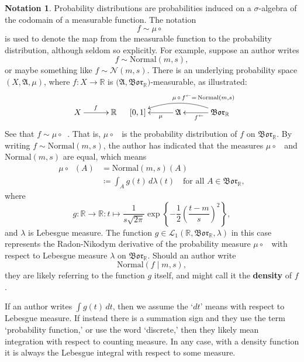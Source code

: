 \documentclass[
twoside=true,
paper=letter,
fontsize=9pt,
pagesize=auto,
leqno,
openany,
headsepline,
overfullrule,
]{scrbook}
\theoremstyle{plain}
\theoremstyle{plain}
\theoremstyle{definition}
\newtheorem{notn}[thm]{Notation}
\theoremstyle{bfnoteitalic}
\theoremstyle{bfnoteroman}
\newcommand{\term}[1]{\textbf{#1}\index{#1}}
\newcommand{\sigalg}[1]{\mathfrak{#1}}
\newcommand{\cali}[1]{\mathscr{#1}}
\newcommand{\definedby}{\coloneqq}
\newcommand{\borel}{\mathfrak{Bor}}
\newcommand{\textsigma}{\hbox{\large{$\sigma$}}\kern-1pt}
\newcommand{\preimage}[1]{\mathop{#1^{\leftarrow}}}
\newcommand{\R}{\mathbb{R}}
\newcommand{\sigmaalgebra}{\sigalg{A}}
\newcommand{\funcf}{f}
\newcommand{\funcg}{g}
\newcommand{\function}{f}
\newcommand{\functionii}{g}
\newcommand{\measurespace}{X}
\newcommand{\measure}{\mu}
\newcommand{\measmu}{\mu}
\newcommand{\measlambda}{\lambda}
\newcommand{\seti}{A}
\begin{document}
\begin{notn}\label{density_functions}
Probability distributions are probabilities induced on a \textsigma-algebra of the codomain of a measurable function. The notation
\[
\function \sim \measure\circ\preimage{\function}
\]
is used to denote the map from the measurable function to the probability distribution, although seldom so explicitly.
For example, suppose an author writes 
\[
\function\sim \text{Normal}(m,s),
\]
or maybe something like $\function\sim \cali{N}(m,s)$.
There is an underlying probability space
$(\measurespace,\sigmaalgebra,\measmu)$, where 
$\funcf:\measurespace\to\R$
is  
$\bigl(\sigmaalgebra,\borel_\R \bigr)$\hyp{}measurable,
as illustrated:
\[
\xymatrix@R=18pt@C=30pt{\measurespace \ar[r]^\funcf & \R \\}
\quad
\xymatrix@R=18pt@C=30pt{
[0,1]
& \sigmaalgebra 
\ar[l]^-\measmu
& \borel_\R
\ar[l]^{\preimage{\funcf}} 
\ar@/_12pt/[ll]_{\measmu\,\circ\,
\funcf
\makebox[0pt][l]{$\scriptstyle{^\leftarrow =\, \text{Normal}(m,s)}$}}
}
\]
%
%
%
See that
$\function\sim \measmu\circ \preimage{\function}$.
That is, $\measmu\circ \preimage{\function}$ is the probability distribution of $\function$ on 
$\borel_\R$.
By writing $\function\sim \text{Normal}(m,s)$, the author has indicated that the measures 
$\measmu\circ \preimage{\function}$ and
$\text{Normal}(m,s)$ are equal,
which means
\begin{align*}
\measmu\circ \preimage{\function}(\seti) 
&= \text{Normal}(m,s)(\seti) \\
&\definedby\int_\seti \functionii(t)\,d\lambda(t)\quad\text{for all $\seti\in\borel_\R$},
\end{align*}
where 
\[
\functionii :\R\to\R:
t\mapsto
\frac{1}{s\sqrt{2\pi}}
\exp
\left\{
-\frac{1}{2}
\left(
\frac{t-m}{s}
\right)^2
\right\},
\]
and $\measlambda$ is Lebesgue measure.
The function 
$\functionii \in\cali{L}_1(\R,\borel_\R,\lambda)$
in this case represents the Radon-Nikodym derivative of the probability measure
$\measmu \circ \preimage{\function}$
with respect to Lebesgue measure $\lambda$ on $\borel_\R$.
Should an author write 
\[\text{Normal}(\function\mid m,s),\] they are likely referring to the function $\functionii$ itself, and might call it the \term{density} of $\function$. 

If an author  writes $\int \funcg(t)\,dt$, then we assume the `$dt$' means with respect to Lebesgue measure. If instead there is a summation sign and they use the term `probability function,' or use the word `discrete,' then they likely mean integration with respect to counting measure.  In any case, with a density function it is always the Lebesgue integral with respect to some measure.
\end{notn}
\end{document}

